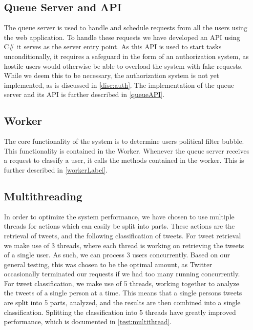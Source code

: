 \subsection{Queue Server and API}
The queue server is used to handle and schedule requests from all the users
using the web application. To handle these requests we have developed an API
using C\# it serves as the server entry point. As this API is used to start
tasks unconditionally, it requires a safeguard in the form of an authorization
system, as hostile users would otherwise be able to overload the system with
fake requests. While we deem this to be necessary, the authorization system is
not yet implemented, as is discussed in \autoref{disc:auth}. The implementation
of the queue server and its API is further described in \autoref{queueAPI}.

\subsection{Worker}
The core functionality of the system is to determine users political filter
bubble. This functionality is contained in the Worker. Whenever the queue server
receives a request to classify a user, it calls the methods contained in the
worker. This is further described in \autoref{workerLabel}.

\subsection{Multithreading}\label{subs:multithread}
In order to optimize the system performance, we have chosen to use multiple
threads for actions which can easily be split into parts. These actions are the
retrieval of tweets, and the following classification of tweets. For tweet
retrieval we make use of 3 threads, where each thread is working on retrieving
the tweets of a single user. As such, we can process 3 users concurrently. Based
on our general testing, this was chosen to be the optimal amount, as Twitter
occasionally terminated our requests if we had too many running concurrently.\\
For tweet classification, we make use of 5 threads, working together to analyze
the tweets of a single person at a time. This means that a single persons tweets
are split into 5 parts, analyzed, and the results are then combined into a
single classification. Splitting the classification into 5 threads have greatly
improved performance, which is documented in \autoref{test:multithread}.

